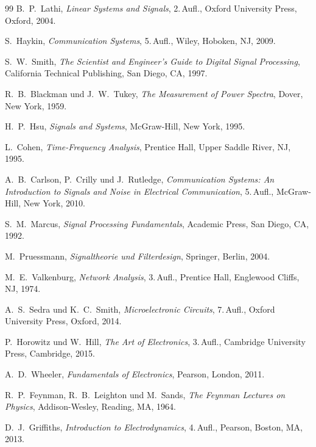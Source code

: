\documentclass[a4paper,12pt,twoside]{report}
\theoremstyle{definition}
\begin{document}
\begin{thebibliography}{99}
	B.~P.~Lathi,
	\textit{Linear Systems and Signals},
	2.\,Aufl., Oxford University Press, Oxford, 2004.

	S.~Haykin,
	\textit{Communication Systems},
	5.\,Aufl., Wiley, Hoboken, NJ, 2009.

	S.~W.~Smith,
	\textit{The Scientist and Engineer's Guide to Digital Signal Processing},
	California Technical Publishing, San Diego, CA, 1997.

	R.~B.~Blackman und J.~W.~Tukey,
	\textit{The Measurement of Power Spectra},
	Dover, New York, 1959.

	H.~P.~Hsu,
	\textit{Signals and Systems},
	McGraw-Hill, New York, 1995.

	L.~Cohen,
	\textit{Time-Frequency Analysis},
	Prentice Hall, Upper Saddle River, NJ, 1995.

	A.~B.~Carlson, P.~Crilly und J.~Rutledge,
	\textit{Communication Systems: An Introduction to Signals and Noise in Electrical Communication},
	5.\,Aufl., McGraw-Hill, New York, 2010.

	S.~M.~Marcus,
	\textit{Signal Processing Fundamentals},
	Academic Press, San Diego, CA, 1992.

	M.~Pruessmann,
	\textit{Signaltheorie und Filterdesign},
	Springer, Berlin, 2004.

	M.~E.~Valkenburg,
	\textit{Network Analysis},
	3.\,Aufl., Prentice Hall, Englewood Cliffs, NJ, 1974.

	A.~S.~Sedra und K.~C.~Smith,
	\textit{Microelectronic Circuits},
	7.\,Aufl., Oxford University Press, Oxford, 2014.

	P.~Horowitz und W.~Hill,
	\textit{The Art of Electronics},
	3.\,Aufl., Cambridge University Press, Cambridge, 2015.

	A.~D.~Wheeler,
	\textit{Fundamentals of Electronics},
	Pearson, London, 2011.

	R.~P.~Feynman, R.~B.~Leighton und M.~Sands,
	\textit{The Feynman Lectures on Physics},
	Addison-Wesley, Reading, MA, 1964.

	D.~J.~Griffiths,
	\textit{Introduction to Electrodynamics},
	4.\,Aufl., Pearson, Boston, MA, 2013.


\end{thebibliography}
\end{document}
